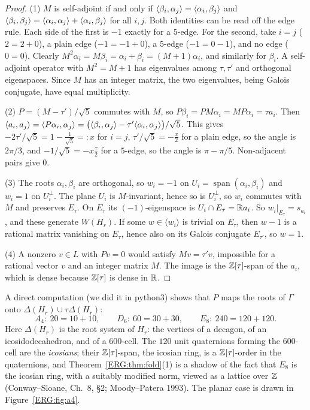 \begin{proof}
(1) $M$ is self-adjoint if and only if $\langle \beta_i, \alpha_j\rangle=\langle \alpha_i, \beta_j\rangle$ and
$\langle \beta_i, \beta_j\rangle=\langle \alpha_i, \alpha_j\rangle+\langle \alpha_i, \beta_j\rangle$ for all $i,j$. Both identities can
be read off the edge rule. Each side of the first is $-1$ exactly for a $5$-edge. For the second, take
$i=j$ ($2=2+0$), a plain edge ($-1=-1+0$), a $5$-edge ($-1=0-1$), and no edge ($0=0$). Clearly
$M^2\alpha_i=M\beta_i=\alpha_i+\beta_i=(M+1)\alpha_i$, and similarly for $\beta_i$. A self-adjoint
operator with $M^2=M+1$ has eigenvalues among $\tau,\tau'$ and orthogonal eigenspaces. Since $M$ has an
integer matrix, the two eigenvalues, being Galois conjugate, have equal multiplicity.

(2) $P=(M-\tau')/\sqrt5$ commutes with $M$, so $P\beta_i=PM\alpha_i=MP\alpha_i=\tau a_i$. Then
$\langle a_i, a_j\rangle=\langle P\alpha_i, \alpha_j\rangle=\big(\langle \beta_i, \alpha_j\rangle-\tau'\langle \alpha_i, \alpha_j\rangle\big)/\sqrt5$.
This gives $-2\tau'/\sqrt5=1-\frac1{\sqrt5}=:x$ for $i=j$, $\tau'/\sqrt5=-\frac x2$ for a plain edge, so
the angle is $2\pi/3$, and $-1/\sqrt5=-x\frac\tau2$ for a $5$-edge, so the angle is $\pi-\pi/5$. Non-adjacent
pairs give $0$.

(3) The roots $\alpha_i,\beta_i$ are orthogonal, so $w_i=-1$ on $U_i=\operatorname{span}(\alpha_i,\beta_i)$
and $w_i=1$ on $U_i^\perp$. The plane $U_i$ is $M$-invariant, hence so is $U_i^\perp$, so $w_i$ commutes
with $M$ and preserves $E_\tau$. On $E_\tau$ its $(-1)$-eigenspace is $U_i\cap E_\tau=\mathbb{R} a_i$. So
$w_i|_{E_\tau}=s_{a_i}$, and these generate $W(H_r)$. If some $w\in\langle w_i\rangle$ is trivial on
$E_\tau$, then $w-1$ is a rational matrix vanishing on $E_\tau$, hence also on its Galois conjugate
$E_{\tau'}$, so $w=1$.

(4) A nonzero $v\in L$ with $Pv=0$ would satisfy $Mv=\tau'v$, impossible for a rational vector $v$ and an
integer matrix $M$. The image is the $\mathbb{Z}[\tau]$-span of the $a_i$, which is dense because $\mathbb{Z}[\tau]$ is
dense in $\mathbb{R}$.
\end{proof}

A direct computation (we did it in python3) shows that $P$ maps the roots of $\Gamma$ onto
$\Delta(H_r)\cup\tau\Delta(H_r)$:
\[
  A_4:\ 20=10+10,\qquad D_6:\ 60=30+30,\qquad E_8:\ 240=120+120 .
\]
Here $\Delta(H_r)$ is the root system of $H_r$: the vertices of a decagon, of an icosidodecahedron, and
of a $600$-cell. The $120$ unit quaternions forming the $600$-cell are the \emph{icosians}; their
$\mathbb{Z}[\tau]$-span, the icosian ring, is a $\mathbb{Z}[\tau]$-order in the quaternions, and Theorem~\ref{ERG:thm:fold}(1) is a shadow of the fact that $E_8$ is the
icosian ring, with a suitably modified norm, viewed as a lattice over $\mathbb{Z}$ (Conway--Sloane, Ch.~8, \S2; Moody--Patera 1993). The planar
case is drawn in Figure~\ref{ERG:fig:a4}.

